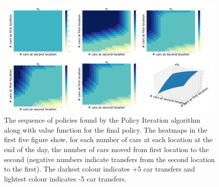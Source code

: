 \documentclass{article}
\begin{document}
\begin{figure}
    \graphicspath{ {../Experiments/JackRentalProblem/PolicyIteration/} }
    \begin{center}
    \includegraphics[width=15cm]{Compact1.png}
    \end{center}
    \caption{The sequence of policies found by the Policy Iteration algorithm along with value function for the final policy. The
    heatmaps in the first five figure show, for each number of cars at each location at the end of the day, the number of cars moved
    from first location to the second (negative numbers indicate transfers from the second location to the first). The darkest 
    colour indicates +5 car transfers and lightest colour indicates -5 car transfers.}
    \label{policy_iter_jack_problem}
\end{figure}
\end{document}
